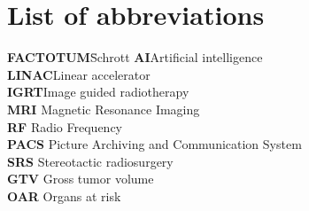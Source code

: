 \documentclass[12pt,a4paper]{report}
\begin{document}
\printbibliography



\newpage
\appendix

\chapter*{List of abbreviations}

\begin{tabbing}
	\textbf{FACTOTUM}\hspace{1cm}\=Schrott\kill
    \textbf{AI}\>Artificial intelligence  \\
	\textbf{LINAC}\>Linear accelerator \\
    \textbf{IGRT}\>Image guided radiotherapy  \\
	\textbf{MRI} \> Magnetic Resonance Imaging\\
    \textbf{RF} \> Radio Frequency\\
    \textbf{PACS} \> Picture Archiving and Communication System\\
    \textbf{SRS} \> Stereotactic radiosurgery\\
    \textbf{GTV} \> Gross tumor volume\\
    \textbf{OAR} \> Organs at risk\\
\end{tabbing}

\newpage


\renewcommand{\baselinestretch}{1.3}
\small\normalsize

\listoffigures

\renewcommand{\baselinestretch}{1}
\small\normalsize

\newpage


\renewcommand{\baselinestretch}{1.3}
\small\normalsize

\listoftables

\renewcommand{\baselinestretch}{1}
\small\normalsize

\newpage

\end{document}
